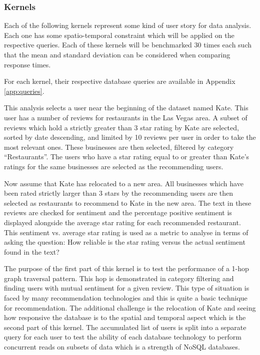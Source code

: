 
\subsubsection{Kernels}
\label{sec:kernels}

Each of the following kernels represent some kind of user story for data analysis. Each one has some spatio-temporal constraint which will be applied on the respective queries. Each of these kernels will be benchmarked 30 times each such that the mean and standard deviation can be considered when comparing response times. 

For each kernel, their respective database queries are available in Appendix \ref{app:queries}.


This analysis selects a user near the beginning of the dataset named Kate. This user has a number of reviews for restaurants in the Las Vegas area. A subset of reviews which hold a strictly greater than 3 star rating by Kate are selected, sorted by date descending, and limited by 10 reviews per user in order to take the most relevant ones. These businesses are then selected, filtered by category ``Restaurants''. The users who have a star rating equal to or greater than Kate's ratings for the same businesses are selected as the recommending users.

Now assume that Kate has relocated to a new area. All businesses which have been rated strictly larger than 3 stars by the recommending users are then selected as restaurants to recommend to Kate in the new area. The text in these reviews are checked for sentiment and the percentage positive sentiment is displayed alongside the average star rating for each recommended restaurant. This sentiment vs. average star rating is used as a metric to analyse in terms of asking the question: How reliable is the star rating versus the actual sentiment found in the text?

The purpose of the first part of this kernel is to test the performance of a 1-hop graph traversal pattern. This hop is demonstrated in category filtering and finding users with mutual sentiment for a given review. This type of situation is faced by many recommendation technologies and this is quite a basic technique for recommendation. The additional challenge is the relocation of Kate and seeing how responsive the database is to the spatial and temporal aspect which is the second part of this kernel. The accumulated list of users is split into a separate query for each user to test the ability of each database technology to perform concurrent reads on subsets of data which is a strength of NoSQL databases.

